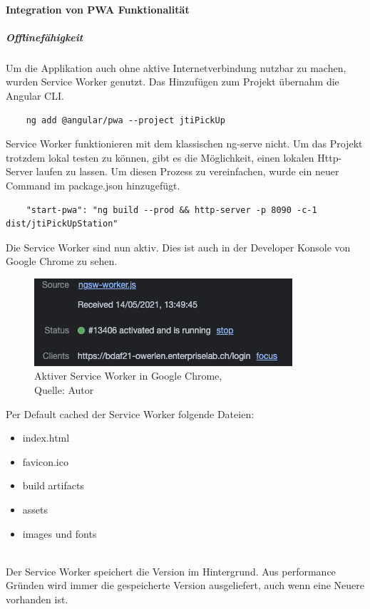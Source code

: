 \paragraph{Integration von \gls{PWA} Funktionalität}
\subparagraph{Offlinefähigkeit}
Um die Applikation auch ohne aktive Internetverbindung nutzbar zu machen, wurden Service Worker genutzt. Das Hinzufügen zum Projekt übernahm die Angular CLI. 
\begin{verbatim}
	ng add @angular/pwa --project jtiPickUp
\end{verbatim}
Service Worker funktionieren mit dem klassischen ng-serve nicht. Um das Projekt trotzdem lokal testen zu können, gibt es die Möglichkeit, einen lokalen Http-Server laufen zu lassen. Um diesen Prozess zu vereinfachen, wurde ein neuer Command im package.json hinzugefügt. 
\begin{verbatim}
	"start-pwa": "ng build --prod && http-server -p 8090 -c-1 dist/jtiPickUpStation"
\end{verbatim}
Die Service Worker sind nun aktiv. Dies ist auch in der Developer Konsole von Google Chrome zu sehen. 
\begin{figure}[H]
	\centering
	\includegraphics[scale=0.6]{images/serviceWorker.PNG}
	\caption[Aktiver Service Worker in Google Chrome]{Aktiver Service Worker in Google Chrome,\\ Quelle: Autor}
	\label{img: serviceWorker}
\end{figure} 

Per Default cached der Service Worker folgende Dateien: 
\begin{itemize}
	\item index.html
	\item favicon.ico
	\item build artifacts
	\item assets 
	\item images und fonts
\end{itemize} \cite{serviceWorker}\\
Der Service Worker speichert die Version im Hintergrund. Aus performance Gründen wird immer die gespeicherte Version ausgeliefert, auch wenn eine Neuere vorhanden ist. \\

